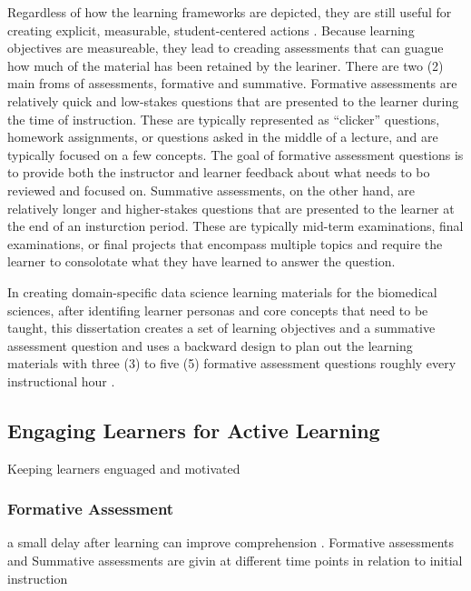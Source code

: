 \documentclass[010-intro.tex]{subfiles}
\begin{document}
        Regardless of how the learning frameworks are depicted,
        they are still useful for creating explicit, measurable, student-centered actions
        \cite{wilson2019teaching, ambrose2010learning}.
        Because learning objectives are measureable, they lead to creading assessments that can guague
        how much of the material has been retained by the leariner.
        There are two (2) main froms of assessments, formative and summative.
        Formative assessments are relatively quick and low-stakes questions that are presented to the learner
        during the time of instruction.
        These are typically represented as ``clicker'' questions, homework assignments, or questions asked in the middle of a lecture,
        and are typically focused on a few concepts.
        The goal of formative assessment questions is to provide both the instructor and learner
        feedback about what needs to bo reviewed and focused on.
        Summative assessments, on the other hand, are relatively longer and higher-stakes questions that are presented
        to the learner at the end of an insturction period.
        These are typically mid-term examinations, final examinations, or final projects
        that encompass multiple topics and require the learner to consolotate what they have learned to answer the question.

        In creating domain-specific data science learning materials for the biomedical sciences,
        after identifing learner personas and core concepts that need to be taught,
        this dissertation creates a set of learning objectives and a summative assessment question
        and uses a backward design to plan out the learning materials with three (3) to five (5)
        formative assessment questions roughly every instructional hour
        \cite{wilson2019teaching}.


    \subsection{Engaging Learners for Active Learning}

        Keeping learners enguaged and motivated

        \subsubsection{Formative Assessment}


            a small delay after learning can improve comprehension
            \cite{andersonWhyDelayedSummaries2008,}.
            Formative assessments and Summative assessments are givin at different time points in relation to
            initial instruction
\end{document}
